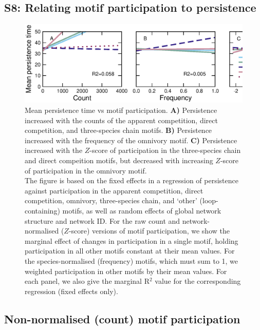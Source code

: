 \documentclass[12pt]{article}
\begin{document}
\begin{spacing}{2.0}
\clearpage


\section*{S8: Relating motif participation to persistence}


    \begin{figure}[ht!]
        \centering
        \includegraphics[width=\textwidth]{figures/roles/persistence_vs_motifs.eps}
        \caption{Mean persistence time vs motif participation. \textbf{A)} Persistence increased with the counts of the apparent competition, direct competition, and three-species chain motifs. \textbf{B)} Persistence increased with the frequency of the omnivory motif. \textbf{C)} Persistence increased with the $Z$-score of participation in the three-species chain and direct compeition motifs, but decreased with increasing $Z$-score of participation in the omnivory motif. \\The figure is based on the fixed effects in a regression of persistence against participation in the apparent competition, direct competition, omnivory, three-species chain, and `other' (loop-containing) motifs, as well as random effects of global network structure and network ID. For the raw count and network-normalised ($Z$-score) versions of motif participation, we show the marginal effect of changes in participation in a single motif, holding participation in all other motifs constant at their mean values. For the species-normalised (frequency) motifs, which must sum to 1, we weighted participation in other motifs by their mean values. For each panel, we also give the marginal R$^2$ value for the corresponding regression (fixed effects only).}
        \label{fig:persistence_motifs}
	    \end{figure}

	
	\subsection*{Non-normalised (count) motif participation}


\end{spacing}
\end{document}
